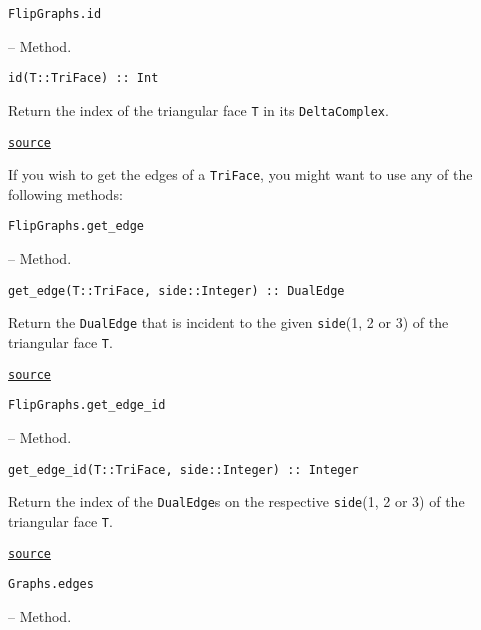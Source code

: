 \hypertarget{5123364288866187946}{\texttt{FlipGraphs.id}}  -- {Method.}

\begin{adjustwidth}{2em}{0pt}


\begin{verbatim}
id(T::TriFace) :: Int
\end{verbatim}

Return the index of the triangular face \texttt{T} in its \texttt{DeltaComplex}. 



\href{https://github.com/schto223/FlipGraphs.jl/blob/e35d43698a06b86273148826b79d585ba04fcd26/src/deltaComplex.jl#L248-L252}{\texttt{source}}


\end{adjustwidth}

If you wish to get the edges of a \texttt{TriFace}, you might want to use any of the following methods:


\hypertarget{13542500775827372404}{\texttt{FlipGraphs.get\_edge}}  -- {Method.}

\begin{adjustwidth}{2em}{0pt}


\begin{verbatim}
get_edge(T::TriFace, side::Integer) :: DualEdge
\end{verbatim}

Return the \texttt{DualEdge} that is incident to the given \texttt{side}(1, 2 or 3) of the triangular face \texttt{T}.



\href{https://github.com/schto223/FlipGraphs.jl/blob/e35d43698a06b86273148826b79d585ba04fcd26/src/deltaComplex.jl#L206-L210}{\texttt{source}}


\end{adjustwidth}
\hypertarget{1436822443817835679}{\texttt{FlipGraphs.get\_edge\_id}}  -- {Method.}

\begin{adjustwidth}{2em}{0pt}


\begin{verbatim}
get_edge_id(T::TriFace, side::Integer) :: Integer
\end{verbatim}

Return the index of the \texttt{DualEdge}s on the respective \texttt{side}(1, 2 or 3) of the triangular face \texttt{T}.



\href{https://github.com/schto223/FlipGraphs.jl/blob/e35d43698a06b86273148826b79d585ba04fcd26/src/deltaComplex.jl#L213-L217}{\texttt{source}}


\end{adjustwidth}
\hypertarget{4963844152486253737}{\texttt{Graphs.edges}}  -- {Method.}


